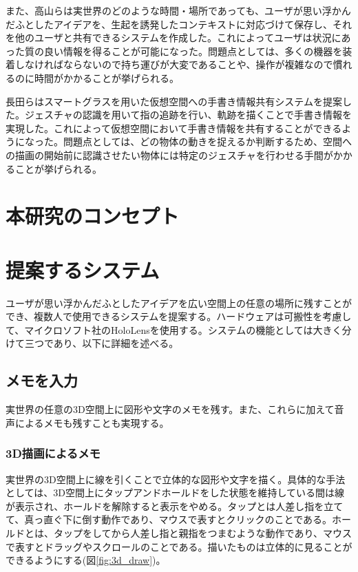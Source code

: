 \documentclass{hissymp}
\begin{document}
また、高山ら\cite{tex3,tex4}は実世界のどのような時間・場所であっても、ユーザが思い浮かんだふとしたアイデアを、生起を誘発したコンテキストに対応づけて保存し、それを他のユーザと共有できるシステムを作成した。これによってユーザは状況にあった質の良い情報を得ることが可能になった。問題点としては、多くの機器を装着しなければならないので持ち運びが大変であることや、操作が複雑なので慣れるのに時間がかかることが挙げられる。

長田ら\cite{tex5}はスマートグラスを用いた仮想空間への手書き情報共有システムを提案した。ジェスチャの認識を用いて指の追跡を行い、軌跡を描くことで手書き情報を実現した。これによって仮想空間において手書き情報を共有することができるようになった。問題点としては、どの物体の動きを捉えるか判断するため、空間への描画の開始前に認識させたい物体には特定のジェスチャを行わせる手間がかかることが挙げられる。

\section{本研究のコンセプト}


\section{提案するシステム}
ユーザが思い浮かんだふとしたアイデアを広い空間上の任意の場所に残すことができ、複数人で使用できるシステムを提案する。ハードウェアは可搬性を考慮して、マイクロソフト社のHoloLens\cite{tex6}を使用する。システムの機能としては大きく分けて三つであり、以下に詳細を述べる。

\subsection{メモを入力}
実世界の任意の3D空間上に図形や文字のメモを残す。また、これらに加えて音声によるメモも残すことも実現する。
\subsubsection{3D描画によるメモ}
実世界の3D空間上に線を引くことで立体的な図形や文字を描く。具体的な手法としては、3D空間上にタップアンドホールドをした状態を維持している間は線が表示され、ホールドを解除すると表示をやめる。タップとは人差し指を立てて、真っ直ぐ下に倒す動作であり、マウスで表すとクリックのことである。ホールドとは、タップをしてから人差し指と親指をつまむような動作であり、マウスで表すとドラッグやスクロールのことである。描いたものは立体的に見ることができるようにする(図\ref{fig:3d_draw})。
\end{document}
